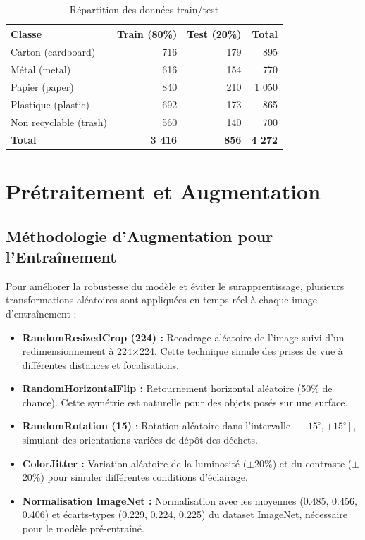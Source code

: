 \documentclass[12pt,a4paper]{report}
\begin{document}
\begin{table}[H]
    \centering
    \caption{Répartition des données train/test}
    \label{tab:stats}
    \begin{tabular}{lrrr}
        \toprule
        \textbf{Classe} & \textbf{Train (80\%)} & \textbf{Test (20\%)} & \textbf{Total} \\
        \midrule
        Carton (cardboard) & 716 & 179 & 895 \\
        Métal (metal) & 616 & 154 & 770 \\
        Papier (paper) & 840 & 210 & 1 050 \\
        Plastique (plastic) & 692 & 173 & 865 \\
        Non recyclable (trash) & 560 & 140 & 700 \\
        \midrule
        \textbf{Total} & \textbf{3 416} & \textbf{856} & \textbf{4 272} \\
        \bottomrule
    \end{tabular}
\end{table}

\section{Prétraitement et Augmentation}

\subsection{Méthodologie d'Augmentation pour l'Entraînement}
Pour améliorer la robustesse du modèle et éviter le surapprentissage, plusieurs transformations aléatoires sont appliquées en temps réel à chaque image d'entraînement :

\begin{itemize}
    \item \textbf{RandomResizedCrop (224) :} Recadrage aléatoire de l'image suivi d'un redimensionnement à 224$\times$224. Cette technique simule des prises de vue à différentes distances et focalisations.
    \item \textbf{RandomHorizontalFlip :} Retournement horizontal aléatoire (50\% de chance). Cette symétrie est naturelle pour des objets posés sur une surface.
    \item \textbf{RandomRotation (15\textdegree)} : Rotation aléatoire dans l'intervalle $[-15^\circ, +15^\circ]$, simulant des orientations variées de dépôt des déchets.
    \item \textbf{ColorJitter :} Variation aléatoire de la luminosité ($\pm$20\%) et du contraste ($\pm$20\%) pour simuler différentes conditions d'éclairage.
    \item \textbf{Normalisation ImageNet :} Normalisation avec les moyennes (0.485, 0.456, 0.406) et écarts-types (0.229, 0.224, 0.225) du dataset ImageNet, nécessaire pour le modèle pré-entraîné.
\end{itemize}
\end{document}

